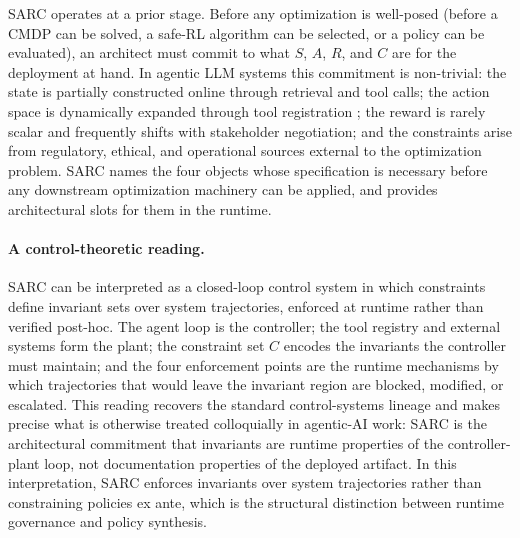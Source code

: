 \documentclass[11pt,a4paper]{article}
\theoremstyle{remark}
\begin{document}
SARC operates at a prior stage. Before any optimization is well-posed (before a CMDP can be solved, a safe-RL algorithm can be selected, or a policy can be evaluated), an architect must commit to what $S$, $A$, $R$, and $C$ are for the deployment at hand. In agentic LLM systems this commitment is non-trivial: the state is partially constructed online through retrieval and tool calls; the action space is dynamically expanded through tool registration \cite{schick2023toolformer,patil2024gorilla}; the reward is rarely scalar and frequently shifts with stakeholder negotiation; and the constraints arise from regulatory, ethical, and operational sources external to the optimization problem. SARC names the four objects whose specification is necessary before any downstream optimization machinery can be applied, and provides architectural slots for them in the runtime.

\paragraph{A control-theoretic reading.} SARC can be interpreted as a closed-loop control system in which constraints define invariant sets over system trajectories, enforced at runtime rather than verified post-hoc. The agent loop is the controller; the tool registry and external systems form the plant; the constraint set $C$ encodes the invariants the controller must maintain; and the four enforcement points are the runtime mechanisms by which trajectories that would leave the invariant region are blocked, modified, or escalated. This reading recovers the standard control-systems lineage \cite{astrom2008feedback} and makes precise what is otherwise treated colloquially in agentic-AI work: SARC is the architectural commitment that invariants are runtime properties of the controller-plant loop, not documentation properties of the deployed artifact. In this interpretation, SARC enforces invariants over system trajectories rather than constraining policies ex ante, which is the structural distinction between runtime governance and policy synthesis.
\end{document}

